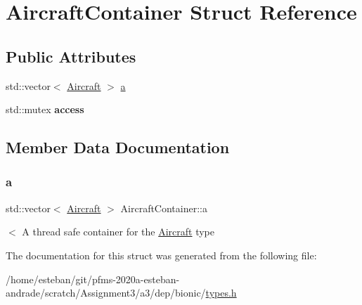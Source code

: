\hypertarget{structAircraftContainer}{}\section{Aircraft\+Container Struct Reference}
\label{structAircraftContainer}
\subsection*{Public Attributes}
\begin{DoxyCompactItemize}
\item 
std\+::vector$<$ \hyperlink{structAircraft}{Aircraft} $>$ \hyperlink{structAircraftContainer_ab1ed617d005237d8c49d5acae8174424}{a}
\item 
\mbox{\label{structAircraftContainer_a0c52481859d8864b461224958c339533}} 
std\+::mutex {\bfseries access}
\end{DoxyCompactItemize}


\subsection{Member Data Documentation}
\mbox{\label{structAircraftContainer_ab1ed617d005237d8c49d5acae8174424}} 
\subsubsection{\texorpdfstring{a}{a}}
{\footnotesize\ttfamily std\+::vector$<$ \hyperlink{structAircraft}{Aircraft} $>$ Aircraft\+Container\+::a}

$<$ A thread safe container for the \hyperlink{structAircraft}{Aircraft} type 

The documentation for this struct was generated from the following file\+:\begin{DoxyCompactItemize}
\item 
/home/esteban/git/pfms-\/2020a-\/esteban-\/andrade/scratch/\+Assignment3/a3/dep/bionic/\hyperlink{bionic_2types_8h}{types.\+h}\end{DoxyCompactItemize}

